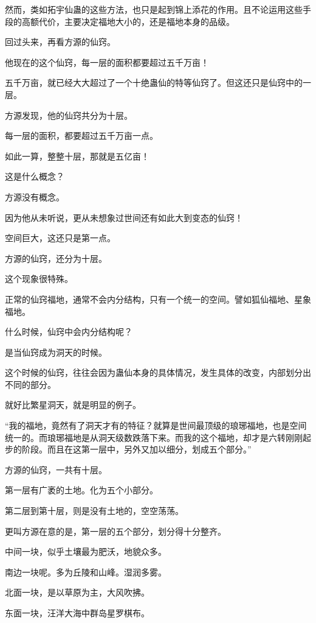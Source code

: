 
\begin{this_body}

然而，类如拓宇仙蛊的这些方法，也只是起到锦上添花的作用。且不论运用这些手段的高额代价，主要决定福地大小的，还是福地本身的品级。

回过头来，再看方源的仙窍。

他现在的这个仙窍，每一层的面积都要超过五千万亩！

五千万亩，就已经大大超过了一个十绝蛊仙的特等仙窍了。但这还只是仙窍中的一层。

方源发现，他的仙窍共分为十层。

每一层的面积，都要超过五千万亩一点。

如此一算，整整十层，那就是五亿亩！

这是什么概念？

方源没有概念。

因为他从未听说，更从未想象过世间还有如此大到变态的仙窍！

空间巨大，这还只是第一点。

方源的仙窍，还分为十层。

这个现象很特殊。

正常的仙窍福地，通常不会内分结构，只有一个统一的空间。譬如狐仙福地、星象福地。

什么时候，仙窍中会内分结构呢？

是当仙窍成为洞天的时候。

这个时候的仙窍，往往会因为蛊仙本身的具体情况，发生具体的改变，内部划分出不同的部分。

就好比繁星洞天，就是明显的例子。

“我的福地，竟然有了洞天才有的特征？就算是世间最顶级的琅琊福地，也是空间统一的。而琅琊福地是从洞天级数跌落下来。而我的这个福地，却才是六转刚刚起步的阶段。而且在这第一层中，另外又加以细分，划成五个部分。”

方源的仙窍，一共有十层。

第一层有广袤的土地。化为五个小部分。

第二层到第十层，则是没有土地的，空空荡荡。

更叫方源在意的是，第一层的五个部分，划分得十分整齐。

中间一块，似乎土壤最为肥沃，地貌众多。

南边一块呢。多为丘陵和山峰。湿润多雾。

北面一块，是以草原为主，大风吹拂。

东面一块，汪洋大海中群岛星罗棋布。


\end{this_body}
